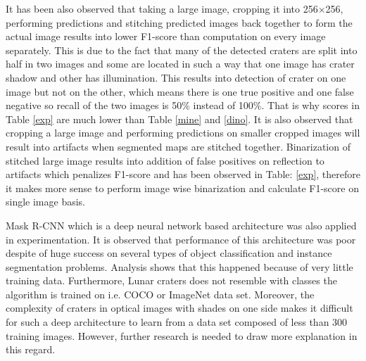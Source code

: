 \documentclass[11pt]{article}
\begin{document}
It has been also observed that taking a large image, cropping it into 256$\times$256, performing predictions and stitching predicted images back together to form the actual image results into lower F1-score than computation on every image separately. This is due to the fact that many of the detected craters are split into half in two images and some are located in such a way that one image has crater shadow and other has illumination. This results into detection of crater on one image but not on the other, which means there is one true positive and one false negative so recall of the two images is 50\% instead of 100\%. That is why scores in Table \ref{exp} are much lower than Table \ref{mine} and \ref{dino}. It is also observed that cropping a large image and performing predictions on smaller cropped images will result into artifacts when segmented maps are stitched together. Binarization of stitched large image results into addition of false positives on reflection to artifacts which penalizes F1-score and has been observed in Table: \ref{exp}, therefore it makes more sense to perform image wise binarization and calculate F1-score on single image basis.

Mask R-CNN which is a deep neural network based architecture was also applied in experimentation. It is observed that performance of this architecture was poor despite of huge success on several types of object classification and instance segmentation problems. Analysis shows that this happened because of very little training data. Furthermore, Lunar craters does not resemble with classes the algorithm is trained on i.e. COCO or ImageNet data set. Moreover, the complexity of craters in optical images with shades on one side makes it difficult for such a deep architecture to learn from a data set composed of less than 300 training images. However, further research is needed to draw more explanation in this regard.
 
\end{document}
